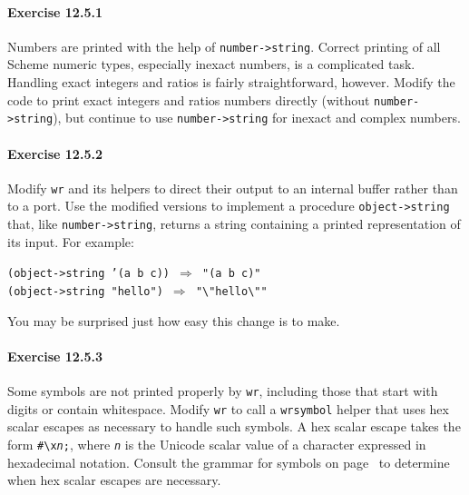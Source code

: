\paragraph{Exercise \label{examples_g177}12.5.1}


\label{examples_s34}Numbers are printed with the help of \texttt{number-\textgreater{}string}.
Correct printing of all Scheme numeric types, especially inexact
numbers, is a complicated task.
Handling exact integers and ratios is fairly
straightforward, however.
Modify the code to print exact integers and ratios numbers directly
(without \texttt{number-\textgreater{}string}), but continue to use \texttt{number-\textgreater{}string}
for inexact and complex numbers.


\paragraph{Exercise \label{examples_g178}12.5.2}


\label{examples_s35}\label{examples_EXOBJTOSTR}Modify \texttt{wr} and its helpers to direct their output to an
internal buffer rather than to a port.
Use the modified versions to implement a procedure \texttt{object-\textgreater{}string}
that, like \texttt{number-\textgreater{}string}, returns a string containing a printed
representation of its input.
For example:


\begin{alltt}
(object-\textgreater{}string '(a b c)) \(\Rightarrow\) "(a b c)"
(object-\textgreater{}string "hello") \(\Rightarrow\) "\textbackslash{}"hello\textbackslash{}""
\end{alltt}


You may be surprised just how easy this change is to make.


\paragraph{Exercise \label{examples_g179}12.5.3}


\label{examples_s36}Some symbols are not printed properly by \texttt{wr}, including those that
start with digits or contain whitespace.
Modify \texttt{wr} to call a \texttt{wrsymbol} helper that uses hex scalar
escapes as necessary to handle such symbols.
A hex scalar escape takes the form \texttt{\#{}\textbackslash{}x\textit{n};}, where \texttt{\textit{n}}
is the Unicode scalar value of a character expressed in hexadecimal
notation.
Consult the grammar for symbols on page \pageref{grammar_grammar_symbols} to
determine when hex scalar escapes are necessary.


